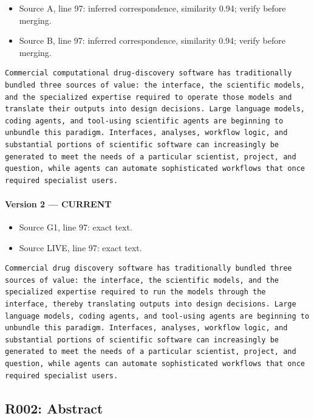 \documentclass[11pt]{article}
\begin{document}
\begin{itemize}[leftmargin=*]
\item Source A, line 97: inferred correspondence, similarity 0.94; verify before merging.
\item Source B, line 97: inferred correspondence, similarity 0.94; verify before merging.
\end{itemize}

\begin{lstlisting}
Commercial computational drug-discovery software has traditionally bundled three sources of value: the interface, the scientific models, and the specialized expertise required to operate those models and translate their outputs into design decisions. Large language models, coding agents, and tool-using scientific agents are beginning to unbundle this paradigm. Interfaces, analyses, workflow logic, and substantial portions of scientific software can increasingly be generated to meet the needs of a particular scientist, project, and question, while agents can automate sophisticated workflows that once required specialist users.
\end{lstlisting}

\paragraph{Version 2 --- CURRENT}

\begin{itemize}[leftmargin=*]
\item Source G1, line 97: exact text.
\item Source LIVE, line 97: exact text.
\end{itemize}

\begin{lstlisting}
Commercial drug discovery software has traditionally bundled three sources of value: the interface, the scientific models, and the specialized expertise required to run the models through the interface, thereby translating outputs into design decisions. Large language models, coding agents, and tool-using agents are beginning to unbundle this paradigm. Interfaces, analyses, workflow logic, and substantial portions of scientific software can increasingly be generated to meet the needs of a particular scientist, project, and question, while agents can automate sophisticated workflows that once required specialist users.
\end{lstlisting}

\subsection{R002: Abstract}
\end{document}
